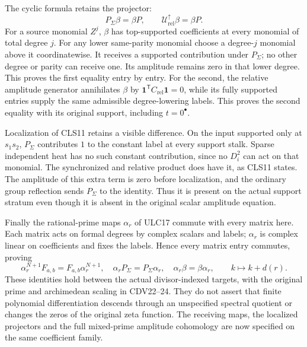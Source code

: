 The cyclic formula retains the projector:
\begin{equation}\tag{CLS12}
 P_\Sigma\beta=\beta P,
 \qquad\mathcal U_{\mathrm{rel}}^\uparrow\beta=\beta P.
\end{equation}
For a source monomial $Z^j$, $\beta$ has top-supported coefficients
at every monomial of total degree $j$. For any lower same-parity
monomial choose a degree-$j$ monomial above it coordinatewise.
It receives a supported contribution under $P_\Sigma$; no other
degree or parity can receive one. Its amplitude remains zero in
that lower degree. This proves the first equality entry by entry.
For the second, the relative amplitude generator annihilates
$\beta$ by $\mathbf1^{\mathsf T}C_{\mathrm{rel}}\mathbf1=0$,
while its fully supported entries supply the same admissible
degree-lowering labels. This proves the second equality with its
original support, including $t=0^\bullet$.

Localization of CLS11 retains a visible difference. On the input
supported only at $s_1s_2$, $P_\Sigma$ contributes $1$ to the
constant label at every support stalk. Sparse independent heat
has no such constant contribution, since no $D_i^2$ can act on
that monomial. The synchronized and relative product does have it,
as CLS11 states. The amplitude of this extra term is zero before
localization, and the ordinary group reflection sends $P_\Sigma$
to the identity. Thus it is present on the actual support stratum
even though it is absent in the original scalar amplitude equation.

Finally the rational-prime maps $\alpha_r$ of ULC17 commute with
every matrix here. Each matrix acts on formal degrees by complex
scalars and labels; $\alpha_r$ is complex linear on coefficients
and fixes the labels. Hence every matrix entry commutes, proving
\begin{equation}\tag{CLS13}
 \alpha_r^{N+1}F_{a,b}=F_{a,b}\alpha_r^{N+1},\quad
 \alpha_rP_\Sigma=P_\Sigma\alpha_r,\quad
 \alpha_r\beta=\beta\alpha_r,
 \qquad k\longmapsto k+d(r).
\end{equation}
These identities hold between the actual divisor-indexed targets,
with the original prime and archimedean scaling in CDV22--24.
They do not assert that finite polynomial differentiation descends
through an unspecified spectral quotient or changes the zeros of
the original zeta function. The receiving maps, the localized
projectors and the full mixed-prime amplitude cohomology are now
specified on the same coefficient family.
